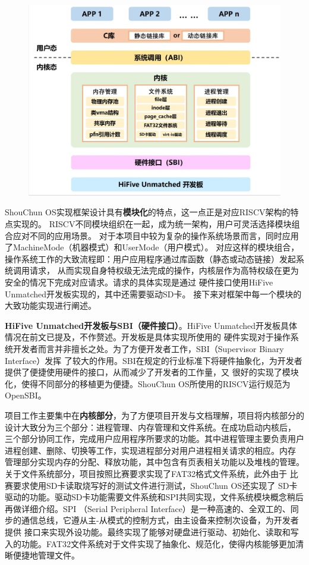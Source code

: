 \documentclass[UTF8,a4paper,10pt]{ctexart}
\begin{document}
\begin{figure}[H]
  \centering
  \includegraphics[scale=0.5]{image/img01.jpg}
\end{figure}

ShouChun OS实现框架设计具有\textbf{模块化}的特点，这一点正是对应RISCV架构的特点实现的。
RISCV不同模块组织在一起，成为统一架构，用户可灵活选择模块组合应对不同的应用场景。
对于本项目中较为复杂的操作系统场景而言，同时应用了MachineMode（机器模式）和UserMode（用户模式）。
对应这样的模块组合，操作系统工作的大致流程即：用户应用程序通过库函数（静态或动态链接）发起系统调用请求，
从而实现自身特权级无法完成的操作，内核层作为高特权级在更为安全的情况下完成对应请求。请求的具体实现是通过
硬件接口使用HiFive Unmatched开发板实现的，其中还需要驱动SD卡。
接下来对框架中每一个模块的大致功能实现进行阐述。

\textbf{HiFive Unmatched开发板与SBI（硬件接口）}。HiFive Unmatched开发板具体情况在前文已提及，不作赘述。开发板是具体实现所使用的
硬件实现对于操作系统开发者而言并非擅长之处。为了方便开发者工作，SBI（Supervisor Binary Interface）发挥
了较大的作用。SBI在规定的行业标准下将硬件抽象化，为开发者提供了便捷使用硬件的接口，从而减少了开发者的工作量，又
很好的实现了模块化，使得不同部分的移植更为便捷。ShouChun OS所使用的RISCV运行规范为OpenSBI。

项目工作主要集中在\textbf{内核部分}，为了方便项目开发与文档理解，项目将内核部分的设计大致分为三个部分：进程管理、内存管理和文件系统。在成功启动内核后，
三个部分协同工作，完成用户应用程序所要求的功能。其中进程管理主要负责用户进程创建、删除、切换等工作，实现进程部分对用户进程相关请求的相应。内存
管理部分实现内存的分配、释放功能，其中包含有页表相关功能以及堆栈的管理。关于文件系统部分，项目按照比赛要求实现了FAT32格式文件系统，此外由于
比赛要求使用SD卡读取烧写好的测试文件进行测试，ShouChun OS还实现了
SD卡驱动的功能。驱动SD卡功能需要文件系统和SPI共同实现，文件系统模块概念稍后再做详细介绍。SPI
（Serial Peripheral Interface）是一种高速的、全双工的、同步的通信总线，它遵从主-从模式的控制方式，由主设备来控制次设备，为开发者提供
接口来实现外设功能。最终实现了能够对硬盘进行驱动、初始化、读取和写入的功能。FAT32文件系统对于文件实现了抽象化、规范化，使得内核能够更加清晰便捷地管理文件。
\end{document}
